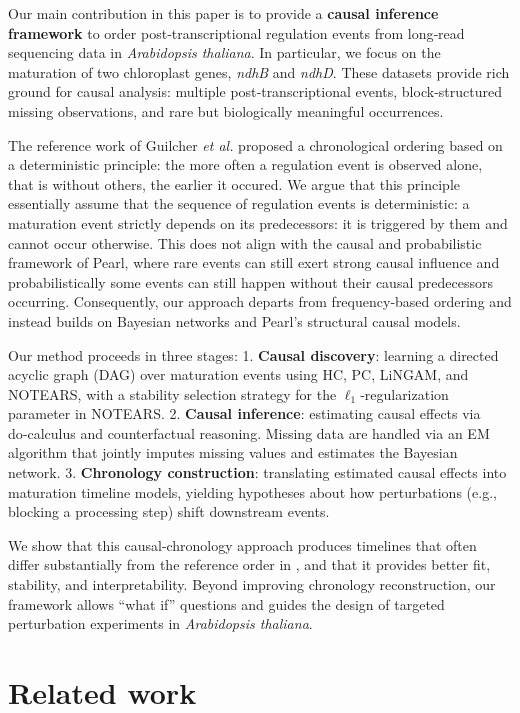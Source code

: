 \documentclass[
]{article}
\theoremstyle{definition}
\theoremstyle{remark}
\begin{document}
Our main contribution in this paper is to provide a \textbf{causal
inference framework} to order post‑transcriptional regulation events
from long‑read sequencing data in \emph{Arabidopsis thaliana}. In
particular, we focus on the maturation of two chloroplast genes,
\emph{ndhB} and \emph{ndhD}. These datasets provide rich ground for
causal analysis: multiple post‑transcriptional events, block‑structured
missing observations, and rare but biologically meaningful occurrences.

The reference work of Guilcher \emph{et al.}
 proposed a chronological
ordering based on a deterministic principle: the more often a regulation
event is observed alone, that is without others, the earlier it occured.
We argue that this principle essentially assume that the sequence of
regulation events is deterministic: a maturation event strictly depends
on its predecessors: it is triggered by them and cannot occur otherwise.
This does not align with the causal and probabilistic framework of
Pearl, where rare events can still exert strong causal influence and
probabilistically some events can still happen without their causal
predecessors occurring. Consequently, our approach departs from
frequency‑based ordering and instead builds on Bayesian networks and
Pearl's structural causal models.

Our method proceeds in three stages: 1. \textbf{Causal discovery}:
learning a directed acyclic graph (DAG) over maturation events using HC,
PC, LiNGAM, and NOTEARS, with a stability selection strategy for the
\(\ell_1\)‑regularization parameter in NOTEARS. 2. \textbf{Causal
inference}: estimating causal effects via do‑calculus and counterfactual
reasoning. Missing data are handled via an EM algorithm that jointly
imputes missing values and estimates the Bayesian network. 3.
\textbf{Chronology construction}: translating estimated causal effects
into maturation timeline models, yielding hypotheses about how
perturbations (e.g., blocking a processing step) shift downstream
events.

We show that this causal‑chronology approach produces timelines that
often differ substantially from the reference order in
, and that it provides
better fit, stability, and interpretability. Beyond improving chronology
reconstruction, our framework allows ``what if'' questions and guides
the design of targeted perturbation experiments in \emph{Arabidopsis
thaliana}.

\section{Related work}\label{sec-related-work}
\end{document}
